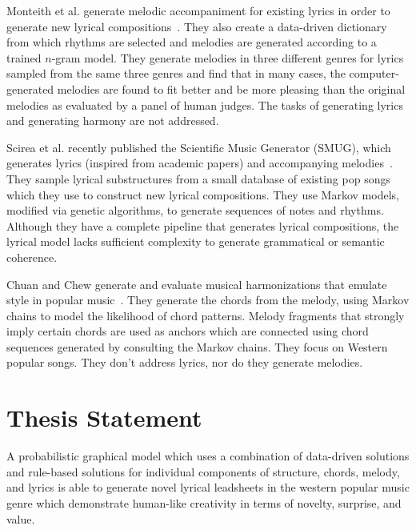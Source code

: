 \documentclass[11pt,phd]{byuprop}
\begin{document}
Monteith et al. generate melodic accompaniment for existing lyrics in order to generate new lyrical compositions~\cite{monteith2012automatic}. They also create a data-driven dictionary from which rhythms are selected and melodies are generated according to a trained $n$-gram model. They generate melodies in three different genres for lyrics sampled from the same three genres and find that in many cases, the computer-generated melodies are found to fit better and be more pleasing than the original melodies as evaluated by a panel of human judges. The tasks of generating lyrics and generating harmony are not addressed.

Scirea et al. recently published the Scientific Music Generator (SMUG), which generates lyrics (inspired from academic papers) and accompanying melodies~\cite{scirea2015smug}. They sample lyrical substructures from a small database of existing pop songs which they use to construct new lyrical compositions. They use Markov models, modified via genetic algorithms, to generate sequences of notes and rhythms. Although they have a complete pipeline that generates lyrical compositions, the lyrical model lacks sufficient complexity to generate grammatical or semantic coherence.

Chuan and Chew generate and evaluate musical harmonizations that emulate style in popular music~\cite{chuan2011generating}. They generate the chords from the melody, using Markov chains to model the likelihood of chord patterns. Melody fragments that strongly imply certain chords are used as anchors which are connected using chord sequences generated by consulting the Markov chains. They focus on Western popular songs. They don't address lyrics, nor do they generate melodies.

\section{Thesis Statement}

A probabilistic graphical model which uses a combination of data-driven solutions and rule-based solutions for individual components of structure, chords, melody, and lyrics is able to generate novel lyrical leadsheets in the western popular music genre which demonstrate human-like creativity in terms of novelty, surprise, and value.
\end{document}
